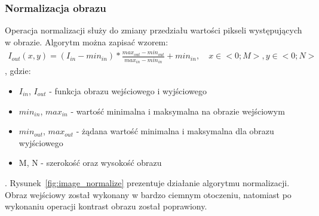 \subsubsection{Normalizacja obrazu}
Operacja normalizacji służy do zmiany przedziału wartości pikseli występujących w obrazie. Algorytm można zapisać wzorem:
\begin{gather*}
  I_{out}(x, y) = (I_{in} - min_{in})*\frac{max_{out} - min_{out}}{max_{in} - min_{in}}+min_{in}, \quad x \in <0; M>,  y \in <0; N>
\end{gather*}, gdzie:
\begin{itemize}
\item $I_{in}$, $I_{out}$ - funkcja obrazu wejściowego i wyjściowego
\item $min_{in}$, $max_{in}$ - wartość minimalna i maksymalna na obrazie wejściowym
\item $min_{out}$, $max_{out}$ - żądana wartość minimalna i maksymalna dla obrazu wyjściowego
\item M, N - szerokość oraz wysokość obrazu
\end{itemize}
. Rysunek~\ref{fig:image_normalize} prezentuje działanie algorytmu normalizacji. Obraz wejściowy został wykonany w bardzo ciemnym otoczeniu, natomiast po wykonaniu operacji kontrast obrazu został poprawiony.
